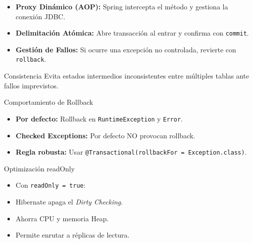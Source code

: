 \documentclass[aspectratio=169]{beamer}
\begin{document}



  {
    \begin{itemize}
      \item \textbf{Proxy Din\'amico (AOP):} Spring intercepta el m\'etodo y gestiona la conexi\'on JDBC.
      \item \textbf{Delimitaci\'on At\'omica:} Abre transacci\'on al entrar y confirma con \texttt{commit}.
      \item \textbf{Gesti\'on de Fallos:} Si ocurre una excepci\'on no controlada, revierte con \texttt{rollback}.
    \end{itemize}
  }
  {Consistencia}
  {Evita estados intermedios inconsistentes entre m\'ultiples tablas ante fallos imprevistos.}

  {Comportamiento de Rollback}
  {
    \begin{itemize}
      \item \textbf{Por defecto:} Rollback en \texttt{RuntimeException} y \texttt{Error}.
      \item \textbf{Checked Exceptions:} Por defecto NO provocan rollback.
      \item \textbf{Regla robusta:} Usar \texttt{@Transactional(rollbackFor = Exception.class)}.
    \end{itemize}
  }
  {Optimizaci\'on readOnly}
  {
    \begin{itemize}
      \item Con \texttt{readOnly = true}:
      \item Hibernate apaga el \textit{Dirty Checking}.
      \item Ahorra CPU y memoria Heap.
      \item Permite enrutar a r\'eplicas de lectura.
    \end{itemize}
  }
\end{document}

